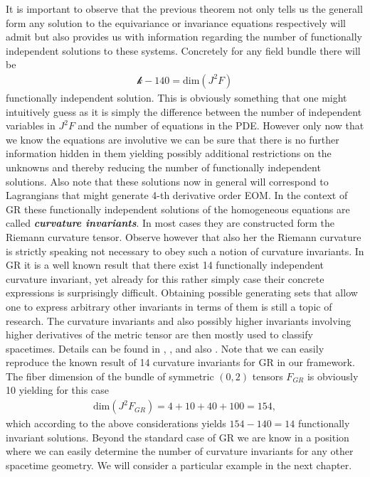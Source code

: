 \documentclass[a4paper,12pt, DIV=14, BCOR=5mm, twoside, headsepline, numbers=noenddot]{scrbook}
\begin{document}
It is important to observe that the previous theorem not only tells us the generall form any solution to the equivariance or invariance equations respectively will admit but also provides us with information regarding the number of functionally independent solutions to these systems. Concretely for any field bundle there will be 
\begin{align}
    \mathcal{k} - 140 = \mathrm{dim}(J^2F)
\end{align}
functionally independent solution. This is obviously something that one might intuitively guess as it is simply the difference between the number of independent variables in $J^2F$ and the number of equations in the PDE. However only now that we know the equations are involutive we can be sure that there is no further information hidden in them yielding possibly additional restrictions on the unknowns and thereby reducing the number of functionally independent solutions. 
Also note that these solutions now in general will correspond to Lagrangians that might generate 4-th derivative order EOM. 
In the context of GR these functionally independent solutions of the homogeneous equations are called \textit{\textbf{curvature invariants}}. In most cases they are constructed form the Riemann curvature tensor. Observe however that also her the Riemann curvature is strictly speaking not necessary to obey such a notion of curvature invariants. 
In GR it is a well known result that there exist 14 functionally independent curvature invariant, yet already for this rather simply case their concrete expressions is surprisingly difficult. Obtaining possible generating sets that allow one to express arbitrary other invariants in terms of them is still a topic of research. The curvature invariants and also possibly higher invariants involving higher derivatives of the metric tensor are then mostly used to classify spacetimes. Details can be found in
\cite{2009CQGra..26b5013C}, \cite{Zakhary1997}, \cite{2002IJMPD..11..827C} and also \cite{doi:10.1063/1.531425}.
Note that we can easily reproduce the known result of 14 curvature invariants for GR in our framework. The fiber dimension of the bundle of symmetric $(0,2)$ tensors $F_{GR}$ is obviously 10 yielding for this case 
\begin{align}
    \mathrm{dim}(J^2F_{GR}) = 4 + 10 + 40 + 100 = 154,
\end{align}
which according to the above considerations yields $154-140=14$ functionally invariant solutions. Beyond the standard case of GR we are know in a position where we can easily determine the number of curvature invariants for any other spacetime geometry. We will consider a particular example in the next chapter.\\ 
\end{document}
